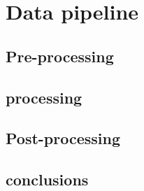 \section{Data pipeline} \label{section:pipeline}

\subsection{Pre-processing}
\subsection{processing}
\subsection{Post-processing}

\subsection{conclusions}
